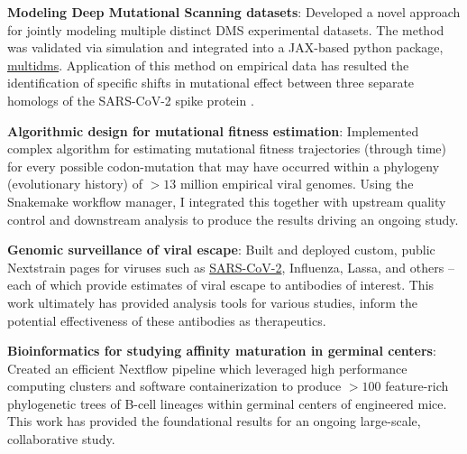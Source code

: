 \documentclass[letterpaper,9pt]{article}
\newcommand{\resumeItem}[2]{
  \begin{minipage}[t]{0.9\textwidth}
    \linespread{0.80}\selectfont
    \vspace{.1cm}\item\small{
      \textbf{#1}{: #2 \vspace{1pt}}
    }
  \end{minipage}
}
\begin{document}
                \resumeItem{Modeling Deep Mutational Scanning datasets}
                    {
                        Developed a novel approach for jointly modeling multiple distinct
                        DMS experimental datasets. The method was validated via simulation 
                        and integrated into a JAX-based python package,
                        \href{https://matsengrp.github.io/multidms/}{multidms}.
                        Application of this method on empirical data has resulted the 
                        identification of specific shifts in mutational
                        effect between three separate homologs of the SARS-CoV-2 spike protein \cite{Haddox_2023}.
                    }
                \resumeItem{Algorithmic design for mutational fitness estimation}
                    {
                        Implemented complex algorithm for 
                        estimating mutational fitness trajectories (through time) for 
                        every possible codon-mutation that may have occurred 
                        within a phylogeny (evolutionary history) of $>13$ million empirical viral genomes.
                        Using the Snakemake workflow manager, I integrated this
                        together with upstream quality control
                        and downstream analysis
                        to produce the results driving an ongoing study.
                    }
                \resumeItem{Genomic surveillance of viral escape}
                    {
                        Built and deployed custom, public Nextstrain pages for viruses such as 
                        \href{https://nextstrain.org/groups/dms-phenotype/ncov/Dadonaite-2023-Cell}{SARS-CoV-2},
                        Influenza, Lassa, and others 
                        -- each of which provide estimates of viral escape to antibodies of interest.
                        This work ultimately has provided analysis tools for various studies,
                        inform the potential effectiveness of these antibodies as therapeutics.
                    }
                \resumeItem{Bioinformatics for studying affinity maturation in germinal centers}
                    {
                        Created an efficient Nextflow pipeline 
                        which leveraged high performance computing clusters and
                        software containerization to produce $>100$ feature-rich phylogenetic trees 
                        of B-cell lineages within germinal centers of engineered mice.
                        This work has provided the foundational results for an ongoing large-scale, 
                        collaborative study.
                    }
\end{document}
